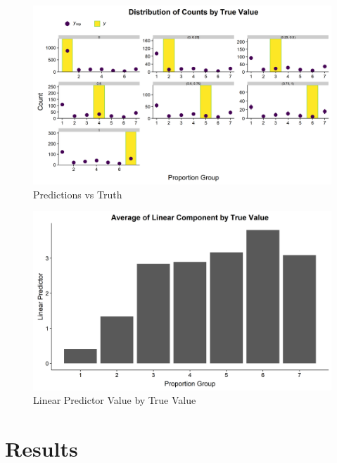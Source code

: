 \documentclass[11pt,twoside]{article}
\numberwithin{Theorem}{section}
\numberwithin{Definition}{section}
\numberwithin{Lemma}{section}
\numberwithin{Algorithm}{section}
\numberwithin{equation}{section}
\begin{document}
\newpage

\begin{figure}[h!]
	\centering
	\includegraphics[width = \textwidth, height = 0.45\textheight]{Figures/4_MC41_BarPred.png}
	\caption{Predictions vs Truth} \label{fig::4_MC41_BarPred}	
\end{figure}


\begin{figure}[h!]
	\centering
	\includegraphics[width = \textwidth, height=0.43\textheight]{Figures/4_MC41_LinPred.png}
	\caption{Linear Predictor Value by True Value} \label{fig::4_MC41_LinPred}	
\end{figure}

\newpage

\clearpage





\newpage

\section{Results} \label{sec::Results}
\end{document}
